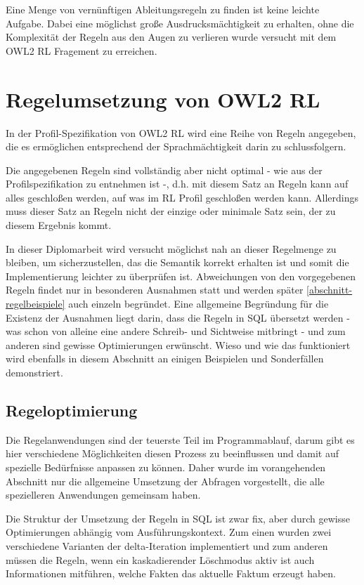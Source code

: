 Eine Menge von vernünftigen Ableitungsregeln zu finden ist keine leichte Aufgabe. Dabei eine möglichst große Ausdrucksmächtigkeit zu erhalten, ohne die Komplexität der Regeln aus den Augen zu verlieren wurde versucht mit dem OWL2 RL Fragement zu erreichen.


\section{Regelumsetzung von OWL2 RL}

In der Profil-Spezifikation von OWL2 RL \cite{OWL2Profiles} wird eine Reihe von Regeln angegeben, die es ermöglichen entsprechend der Sprachmächtigkeit darin zu schlussfolgern.

Die angegebenen Regeln sind vollständig aber nicht optimal - wie aus der Profilspezifikation zu entnehmen ist -, d.h. mit diesem Satz an Regeln kann auf alles geschloßen werden, auf was im RL Profil geschloßen werden kann. Allerdings muss dieser Satz an Regeln nicht der einzige oder minimale Satz sein, der zu diesem Ergebnis kommt.

In dieser Diplomarbeit wird versucht möglichst nah an dieser Regelmenge zu bleiben, um sicherzustellen, das die Semantik korrekt erhalten ist und somit die Implementierung leichter zu überprüfen ist.
Abweichungen von den vorgegebenen Regeln findet nur in besonderen Ausnahmen statt und werden später \ref{abschnitt-regelbeispiele} auch einzeln begründet. Eine allgemeine Begründung für die Existenz der Ausnahmen liegt darin, dass die Regeln in SQL übersetzt werden - was schon von alleine eine andere Schreib- und Sichtweise  mitbringt - und zum anderen sind gewisse Optimierungen erwünscht.
Wieso und wie das funktioniert wird ebenfalls in diesem Abschnitt an einigen Beispielen und Sonderfällen demonstriert.






\subsection{Regeloptimierung}

Die Regelanwendungen sind der teuerste Teil im Programmablauf, darum gibt es hier verschiedene Möglichkeiten diesen Prozess zu beeinflussen und damit auf spezielle Bedürfnisse anpassen zu können. Daher wurde im vorangehenden Abschnitt nur die allgemeine Umsetzung der Abfragen vorgestellt, die alle spezielleren Anwendungen gemeinsam haben.

Die Struktur der Umsetzung der Regeln in SQL ist zwar fix, aber durch gewisse Optimierungen abhängig vom Ausführungskontext. Zum einen wurden zwei verschiedene Varianten der delta-Iteration implementiert und zum anderen müssen die Regeln, wenn ein kaskadierender Löschmodus aktiv ist auch Informationen mitführen, welche Fakten das aktuelle Faktum erzeugt haben.
